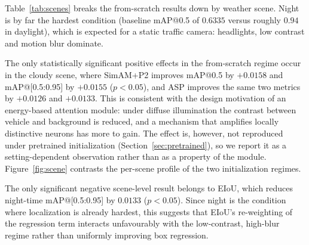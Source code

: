 \documentclass[pdflatex,sn-basic,Numbered]{sn-jnl}%
\begin{document}
Table~\ref{tab:scenes} breaks the from-scratch results down by weather scene. Night is by far the hardest condition (baseline mAP@0.5 of $0.6335$ versus roughly $0.94$ in daylight), which is expected for a static traffic camera: headlights, low contrast and motion blur dominate.

The only statistically significant positive effects in the from-scratch regime occur in the cloudy scene, where SimAM+P2 improves mAP@0.5 by $+0.0158$ and mAP@[0.5:0.95] by $+0.0155$ ($p<0.05$), and ASP improves the same two metrics by $+0.0126$ and $+0.0133$. This is consistent with the design motivation of an energy-based attention module: under diffuse illumination the contrast between vehicle and background is reduced, and a mechanism that amplifies locally distinctive neurons has more to gain. The effect is, however, not reproduced under pretrained initialization (Section~\ref{sec:pretrained}), so we report it as a setting-dependent observation rather than as a property of the module. Figure~\ref{fig:scene} contrasts the per-scene profile of the two initialization regimes.

The only significant negative scene-level result belongs to EIoU, which reduces night-time mAP@[0.5:0.95] by $0.0133$ ($p<0.05$). Since night is the condition where localization is already hardest, this suggests that EIoU's re-weighting of the regression term interacts unfavourably with the low-contrast, high-blur regime rather than uniformly improving box regression.
\end{document}
